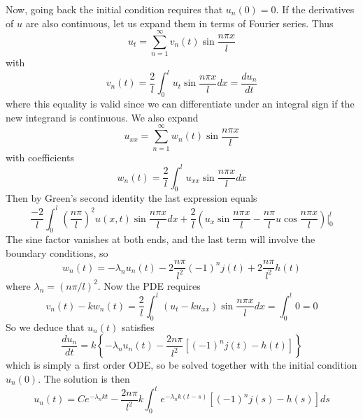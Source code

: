 Now, going back the initial condition requires that $u_n(0) = 0$. If the derivatives of $u$ are also continuous, let us expand them in terms of Fourier series. Thus \begin{equation*}
    u_t = \sum_{n=1}^{\infty}v_n(t)\sin\frac{n\pi x}{l}
\end{equation*}
with \begin{equation*}
    v_n(t) = \frac{2}{l}\int_0^lu_t\sin\frac{n\pi x}{l}dx = \frac{du_n}{dt}
\end{equation*}
where this equality is valid since we can differentiate under an integral sign if the new integrand is continuous. We also expand \begin{equation*}
    u_{xx} = \sum_{n=1}^{\infty}w_n(t)\sin\frac{n\pi x}{l}
\end{equation*}
with coefficients \begin{equation*}
    w_n(t) = \frac{2}{l}\int_0^lu_{xx}\sin\frac{n\pi x}{l}dx
\end{equation*}
Then by Green's second identity the last expression equals \begin{equation*}
    \frac{-2}{l}\int_0^l\left(\frac{n\pi}{l}\right)^2u(x,t)\sin\frac{n\pi x}{l}dx + \frac{2}{l}\left(u_x\sin\frac{n\pi x}{l} - \frac{n\pi}{l}u\cos\frac{n\pi x}{l}\right)\Bigg\rvert_0^l
\end{equation*}
The sine factor vanishes at both ends, and the last term will involve the boundary conditions, so \begin{equation*}
    w_n(t) = -\lambda_nu_n(t) - 2\frac{n\pi}{l^2}(-1)^nj(t) + 2\frac{n\pi}{l^2}h(t)
\end{equation*}
where $\lambda_n = (n\pi/l)^2$. Now the PDE requires \begin{equation*}
    v_n(t) - kw_n(t) = \frac{2}{l}\int_0^l(u_t - ku_{xx})\sin\frac{n\pi x}{l}dx = \int_0^l0 = 0
\end{equation*}
So we deduce that $u_n(t)$ satisfies \begin{equation*}
    \frac{du_n}{dt} = k\left\{-\lambda_nu_n(t) - \frac{2n\pi}{l^2}\left[(-1)^nj(t) - h(t)\right]\right\}
\end{equation*}
which is simply a first order ODE, so be solved together with the initial condition $u_n(0)$. The solution is then \begin{equation}
    \boxed{u_n(t) = Ce^{-\lambda_nkt} - \frac{2n\pi}{l^2}k\int_0^te^{-\lambda_nk(t-s)}\left[(-1)^nj(s)-h(s)\right]ds}
\end{equation}



